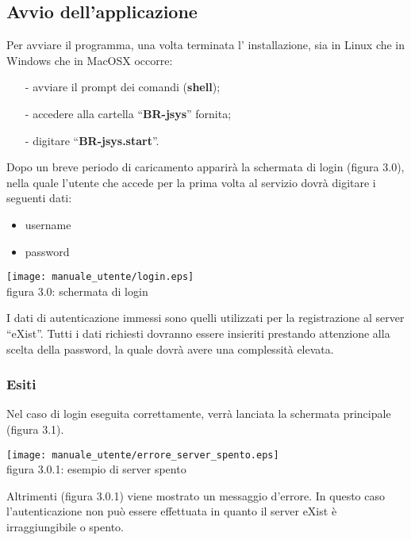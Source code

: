 \subsection{Avvio dell'applicazione}
Per avviare il programma, una volta terminata l' installazione, sia in Linux che in Windows che in MacOSX occorre:
\begin{itemize}
\item[-] avviare il prompt dei comandi (\textbf{shell});
\item[-] accedere alla cartella ``\textbf{BR-jsys}'' fornita; 
\item[-] digitare ``\textbf{BR-jsys.start}''.
\end{itemize}
 Dopo un breve periodo di caricamento apparir\`a la schermata di login (figura 3.0), nella quale l'utente che accede per la prima volta al servizio dovr\`a digitare i seguenti dati: 
\begin{itemize}
\item username
\item password
\end{itemize}
\begin{center}
\texttt{[image: manuale\_utente/login.eps]}\\
 figura 3.0: schermata di login
\end{center}
I dati di autenticazione immessi sono quelli utilizzati per la registrazione al server ``eXist''. Tutti i dati richiesti dovranno essere insieriti prestando attenzione alla scelta della password, la quale dovr\`a avere una complessit\`a elevata. 
\subsubsection{Esiti}
Nel caso di login eseguita correttamente, verr\`a lanciata la schermata principale (figura 3.1).
\begin{center}
\texttt{[image: manuale\_utente/errore\_server\_spento.eps]}\\
 figura 3.0.1: esempio di server spento
\end{center} 
Altrimenti (figura 3.0.1) viene mostrato un messaggio d'errore. In questo caso l'autenticazione non pu\`o essere effettuata in quanto il server eXist \`e irraggiungibile o spento.


